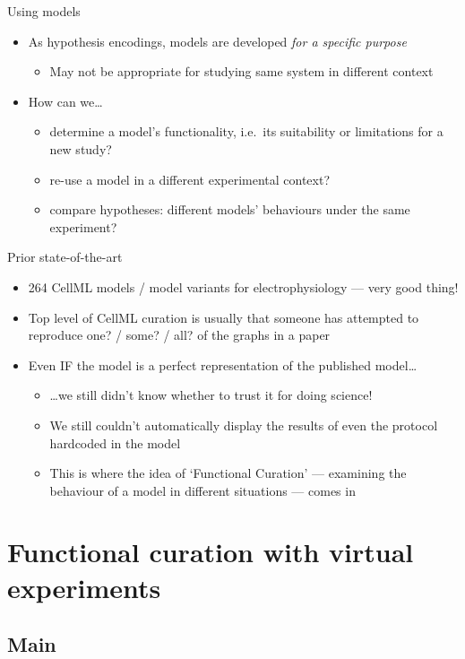\documentclass[t,xcolor={usenames,dvipsnames}]{beamer}
\newcommand{\subitem}[1]{\begin{itemize}[<.->]\item #1 \end{itemize}}
\begin{document}
\begin{frame}{Using models}
\begin{itemize}
\item As hypothesis encodings, models are developed \emph{for a specific purpose}
  \subitem{May not be appropriate for studying same system in different context}
\item How can we\ldots
  \begin{itemize}
  \item determine a model's functionality, i.e.\ its suitability or limitations for a new study?
  \item re-use a model in a different experimental context?
  \item compare hypotheses: different models' behaviours under the same experiment?
  \end{itemize}
\end{itemize}
\end{frame}


\begin{frame}{Prior state-of-the-art}
\begin{itemize}
\item 264 CellML models / model variants for electrophysiology --- very good thing!
\item Top level of CellML curation is usually that someone has attempted to reproduce one? / some? / all? of the graphs in a paper
\item Even IF the model is a perfect representation of the published model\ldots
  \begin{itemize}
  \item \ldots we still didn't know whether to trust it for doing science!
  \item We still couldn't automatically display the results of even the protocol hardcoded in the model
  \item This is where the idea of `Functional Curation' --- examining the behaviour of a model in different situations --- comes in
  \end{itemize}
\end{itemize}
\end{frame}


\section{Functional curation with virtual experiments}
\subsection*{Main}
\end{document}

